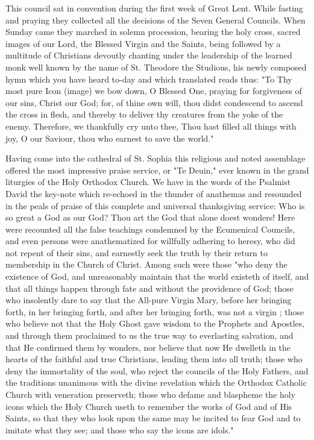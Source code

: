 This council sat in convention during the first 
week of Great Lent. While fasting and praying
they collected all the decisions of the Seven 
General Councils. When Sunday came they 
marched in solemn procession, bearing the holy 
cross, sacred images of our Lord, the Blessed 
Virgin and the Saints, being followed by a multitude
of Christians devoutly chanting under 
the leadership of the learned monk well known 
by the name of St. Theodore the Studious, his 
newly composed hymn which you have heard 
to-day and which translated reads thus: "To 
Thy most pure Icon (image) we bow down, 
O Blessed One, praying for forgiveness of our 
sins, Christ our God; for, of thine own will, 
thou didst condescend to ascend the cross in
flesh, and thereby to deliver thy creatures from 
the yoke of the enemy. Therefore, we thankfully
cry unto thee, Thou hast filled all things 
with joy, O our Saviour, thou who earnest to 
save the world." 

Having come into the cathedral of St. Sophia 
this religious and noted assemblage offered the 
most impressive praise service, or "Te Deuin," 
ever known in the grand liturgies of the Holy 
Orthodox Church. We have in the words of 
the Psalmist David the key-note which re-echoed 
in the thunder of anathemas and resounded in 
the peals of praise of this complete and universal
thanksgiving service: Who is so great a 
God as our God? Thou art the God that alone 
doest wonders! Here were recounted all the 
false teachings condemned by the Ecumenical 
Councils, and even persons were anathematized 
for willfully adhering to heresy, who did not 
repent of their sins, and earnestly seek the truth 
by their return to membership in the Church of 
Christ. Among such were those "who deny 
the existence of God, and unreasonably maintain
that the world existeth of itself, and that 
all things happen through fate and without the 
providence of God; those who insolently dare 
to say that the All-pure Virgin Mary, before her 
bringing forth, in her bringing forth, and after
her bringing forth, was not a virgin ; those who 
believe not that the Holy Ghost gave wisdom 
to the Prophets and Apostles, and through them 
proclaimed to us the true way to everlasting 
salvation, and that He confirmed them by wonders,
nor believe that now He dwelleth in the 
hearts of the faithful and true Christians, leading
them into all truth; those who deny the 
immortality of the soul, who reject the councils 
of the Holy Fathers, and the traditions unanimous
with the divine revelation which the Orthodox
Catholic Church with veneration preserveth;
those who defame and blaspheme the holy 
icons which the Holy Church useth to remember
the works of God and of His Saints, so that 
they who look upon the same may be incited to 
fear God and to imitate what they see; and 
those who say the icons are idols." 


